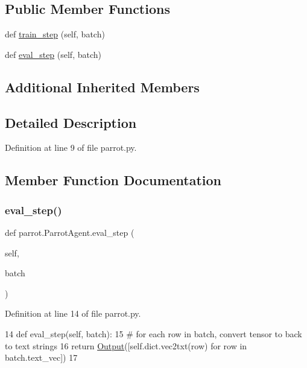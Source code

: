 \subsection*{Public Member Functions}
\begin{DoxyCompactItemize}
\item 
def \hyperlink{classparrot_1_1ParrotAgent_a85446c6c7698b050d80a2324495c9321}{train\+\_\+step} (self, batch)
\item 
def \hyperlink{classparrot_1_1ParrotAgent_a210ad5eb90ce7add4a2b2cb641c4de3c}{eval\+\_\+step} (self, batch)
\end{DoxyCompactItemize}
\subsection*{Additional Inherited Members}


\subsection{Detailed Description}


Definition at line 9 of file parrot.\+py.



\subsection{Member Function Documentation}
\mbox{\label{classparrot_1_1ParrotAgent_a210ad5eb90ce7add4a2b2cb641c4de3c}} 
\subsubsection{\texorpdfstring{eval\+\_\+step()}{eval\_step()}}
{\footnotesize\ttfamily def parrot.\+Parrot\+Agent.\+eval\+\_\+step (\begin{DoxyParamCaption}\item[{}]{self,  }\item[{}]{batch }\end{DoxyParamCaption})}



Definition at line 14 of file parrot.\+py.


\begin{DoxyCode}
14     \textcolor{keyword}{def }eval\_step(self, batch):
15         \textcolor{comment}{# for each row in batch, convert tensor to back to text strings}
16         \textcolor{keywordflow}{return} \hyperlink{namespaceparlai_1_1agents_1_1legacy__agents_1_1seq2seq_1_1torch__agent__v1_a2689006ea97d09413fb242f984bd8016}{Output}([self.dict.vec2txt(row) \textcolor{keywordflow}{for} row \textcolor{keywordflow}{in} batch.text\_vec])
17 \end{DoxyCode}
\mbox{\label{classparrot_1_1ParrotAgent_a85446c6c7698b050d80a2324495c9321}} 
